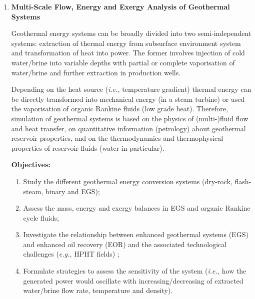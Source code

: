 \documentclass[12pts,a4paper,amsmath,amssymb,floatfix]{article}%
\newcommand{\ie}{{\it i.e., }}
\newcommand{\eg}{{\it e.g., }}
\begin{document}
\begin{enumerate}[label=\bfseries Project: \arabic*:]
\clearpage
\item {\bf Multi-Scale Flow, Energy and Exergy Analysis of Geothermal Systems}

Geothermal energy systems can be broadly divided into two semi-independent systems: extraction of thermal energy from subsurface environment system and transformation of heat into power. The former involves injection of cold water/brine into variable depths with partial or complete vaporisation of water/brine and further extraction in production wells. 

Depending on the heat source (\ie temperature gradient) thermal energy can be directly transformed into mechanical energy (in a steam turbine) or used the vaporisation of organic Rankine fluids (low grade heat). Therefore, simulation of geothermal systems is based on the physics of (multi-)fluid flow and heat transfer, on quantitative information (petrology) about geothermal reservoir properties, and on the thermodynamics and thermophysical properties of reservoir fluids (water in particular). 


\noindent
{\bf Objectives:}
\begin{enumerate}
\item Study the different geothermal energy conversion systems (dry-rock, flash-steam, binary and EGS);
\item Assess the mass, energy and exergy balances in EGS and organic Rankine cycle fluids;
\item Investigate the relationship between enhanced geothermal systems (EGS) and enhanced oil recovery (EOR) and the associated technological challenges (\eg HPHT fields) ;
\item Formulate strategies to assess the sensitivity of the system (\ie how the generated power would oscillate with increasing/decreasing of extracted water/brine flow rate, temperature and density). 
\end{enumerate}


\end{enumerate}
\end{document}
